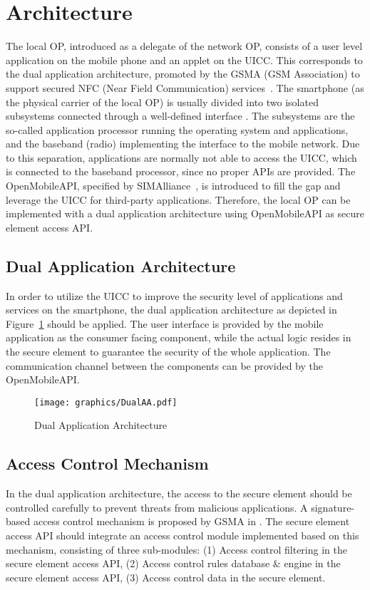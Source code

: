 \documentclass[runningheads,a4paper]{llncs}
\begin{document}
\section{Architecture}
\label{sec:demoarchitecture}
The local OP, introduced as a delegate of the network OP, consists of a user level application on the mobile phone and an applet on the UICC.
This corresponds to the dual application architecture, promoted by the GSMA (GSM Association) to support secured NFC (Near Field Communication) services~\cite{Association2011}.
The smartphone (as the physical carrier of the local OP) is usually divided into two isolated subsystems connected  through a well-defined interface \cite{Verclas2011}.
The subsystems are the so-called application processor running the operating system and applications, and the baseband (radio) implementing the interface to the mobile network. 
Due to this separation, applications are normally not able to access the UICC, which is connected to the baseband processor, since no proper APIs are provided. 
The OpenMobileAPI, specified by SIMAlliance~\cite{OpenMobileAPI2}, is introduced to fill the gap and leverage the UICC for third-party applications. 
Therefore, the local OP can be implemented with a dual application architecture using OpenMobileAPI as secure element access API.

\subsection{Dual Application Architecture}
\label{subsec:dualapplicationarchitecture}
In order to utilize the UICC to improve the security level of applications and services on the smartphone, the dual application architecture as depicted in Figure~\ref{fig:DualAA} should be applied. 
The user interface is provided by the mobile application as the consumer facing component, while the actual logic resides in the secure element to guarantee the security of the whole application. 
The communication channel between the components can be provided by the OpenMobileAPI.

\begin{figure}[t]
	\centering
		\texttt{[image: graphics/DualAA.pdf]}
	\caption{Dual Application Architecture}
	\label{fig:DualAA}
\end{figure}


\subsection{Access Control Mechanism}
\label{subsec:accesscontrolmechanism}
In the dual application architecture, the access to the secure element should be controlled carefully to prevent threats from malicious applications. 
A signature-based access control mechanism is proposed by GSMA in \cite{Association2011}.
The secure element access API should integrate an access control module implemented based on this mechanism, consisting of three sub-modules: 
(1) Access control filtering in the secure element access API, 
(2) Access control rules database \& engine in the secure element access API,
(3) Access control data in the secure element.
\end{document}
